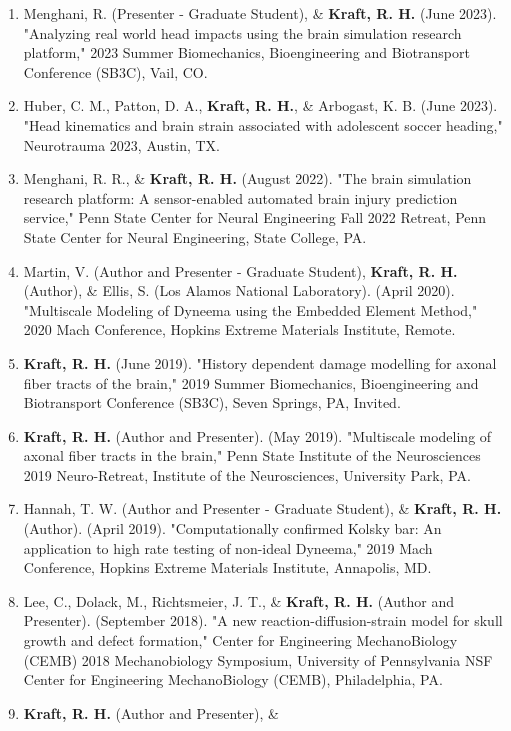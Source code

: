 \documentclass[a4paper,10pt]{article}
\begin{document}
\begin{enumerate}
  \item Menghani, R. (Presenter - Graduate Student), \&
 \textbf{\textbf{Kraft,} R. H.} (June 2023). "Analyzing real world head impacts using the brain simulation research platform," 2023 Summer Biomechanics, Bioengineering and Biotransport Conference (SB3C), Vail, CO.
  \item Huber, C. M., Patton, D. A., \textbf{\textbf{Kraft,} R. H.}, \&
 Arbogast, K. B. (June 2023). "Head kinematics and brain strain associated with adolescent soccer heading," Neurotrauma 2023, Austin, TX.
  \item Menghani, R. R., \&
 \textbf{\textbf{Kraft,} R. H.} (August 2022). "The brain simulation research platform: A sensor-enabled automated brain injury prediction service," Penn State Center for Neural Engineering Fall 2022 Retreat, Penn State Center for Neural Engineering, State College, PA.
  \item Martin, V. (Author and Presenter - Graduate Student), \textbf{\textbf{Kraft,} R. H.} (Author), \&
 Ellis, S. (Los Alamos National Laboratory). (April 2020). "Multiscale Modeling of Dyneema using the Embedded Element Method," 2020 Mach Conference, Hopkins Extreme Materials Institute, Remote.
  \item \textbf{\textbf{Kraft,} R. H.} (June 2019). "History dependent damage modelling for axonal fiber tracts of the brain," 2019 Summer Biomechanics, Bioengineering and Biotransport Conference (SB3C), Seven Springs, PA, Invited.
  \item \textbf{\textbf{Kraft,} R. H.} (Author and Presenter). (May 2019). "Multiscale modeling of axonal fiber tracts in the brain," Penn State Institute of the Neurosciences 2019 Neuro-Retreat, Institute of the Neurosciences, University Park, PA.
  \item Hannah, T. W. (Author and Presenter - Graduate Student), \&
 \textbf{\textbf{Kraft,} R. H.} (Author). (April 2019). "Computationally confirmed Kolsky bar: An application to high rate testing of non-ideal Dyneema," 2019 Mach Conference, Hopkins Extreme Materials Institute, Annapolis, MD.
  \item Lee, C., Dolack, M., Richtsmeier, J. T., \&
 \textbf{\textbf{Kraft,} R. H.} (Author and Presenter). (September 2018). "A new reaction-diffusion-strain model for skull growth and defect formation," Center for Engineering MechanoBiology (CEMB) 2018 Mechanobiology Symposium, University of Pennsylvania NSF Center for Engineering MechanoBiology (CEMB), Philadelphia, PA.
  \item \textbf{\textbf{Kraft,} R. H.} (Author and Presenter), \&

\end{enumerate}
\end{document}
